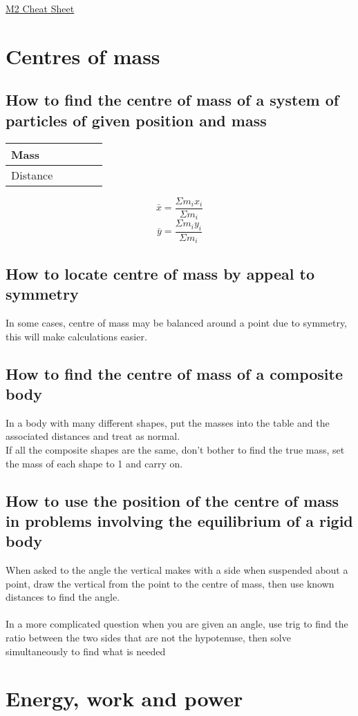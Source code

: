 \documentclass{article}[18pt]
\begin{document}
\begin{center}
\underline{\huge M2 Cheat Sheet}
\end{center}
\section{Centres of mass}
\subsection{How to find the centre of mass of a system of particles of given position and mass}
\begin{tabularx}{\textwidth}{|X|X|X|X|X|}
\hline
Mass&&&&\\
\hline
Distance&&&&\\
\hline
\end{tabularx}
$$\bar{x}=\dfrac{\Sigma m_ix_i}{\Sigma m_i}$$
$$\bar{y}=\dfrac{\Sigma m_iy_i}{\Sigma m_i}$$
\subsection{How to locate centre of mass by appeal to symmetry}
In some cases, centre of mass may be balanced around a point due to symmetry, this will make calculations easier.
\subsection{How to find the centre of mass of a composite body}
In a body with many different shapes, put the masses into the table and the associated distances and treat as normal.\\
If all the composite shapes are the same, don't bother to find the true mass, set the mass of each shape to 1 and carry on.
\subsection{How to use the position of the centre of mass in problems involving the equilibrium of a rigid body}
When asked to the angle the vertical makes with a side when suspended about a point, draw the vertical from the point to the centre of mass, then use known distances to find the angle.\\
\\
In a more complicated question when you are given an angle, use trig to find the ratio between the two sides that are not the hypotenuse, then solve simultaneously to find what is needed
\section{Energy, work and power}
\end{document}
